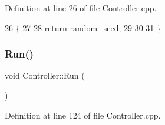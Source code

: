 Definition at line 26 of file Controller.\+cpp.


\begin{DoxyCode}
26                               \{
27   
28   \textcolor{keywordflow}{return} random\_seed;
29   
30   
31 \}
\end{DoxyCode}
\mbox{\label{classController_a17abb2cec6c0109e9b2df3cdc082eaad}} 
\subsubsection{\texorpdfstring{Run()}{Run()}}
{\footnotesize\ttfamily void Controller\+::\+Run (\begin{DoxyParamCaption}{ }\end{DoxyParamCaption})}



Definition at line 124 of file Controller.\+cpp.


